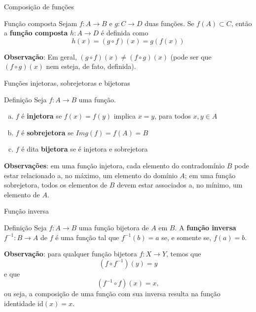 \begin{frame}[fragile]{Composição de funções}

    \begin{block}{Função composta}
        Sejam $f: A\to B$ e $g: C\to D$ duas funções. Se $f(A)\subset C$, então a \textbf{função
            composta} $h: A\to D$ é definida como
        \[
            h(x) = (g\circ f)(x) = g(f(x))
        \]
    \end{block}

    \vspace{0.2in}

    \textbf{Observação}: Em geral, $(g\circ f)(x) \neq (f\circ g)(x)$ (pode ser que $(f\circ g)(x)$
        nem esteja, de fato, definida).

\end{frame}

\begin{frame}[fragile]{Funções injetoras, sobrejetoras e bijetoras}

    \begin{block}{Definição}
        Seja $f:A\to B$ uma função.
        \begin{enumerate}[(a)]
            \item $f$ é \textbf{injetora} se $f(x) = f(y)$ implica $x = y$, para todos $x, y\in A$
            \item $f$ é \textbf{sobrejetora} se $Img(f) = f(A) = B$
            \item $f$ é dita \textbf{bijetora} se é injetora e sobrejetora
        \end{enumerate}
    \end{block}

    \vspace{0.1in}
    
    \textbf{Observações}: em uma função injetora, cada elemento do contradomínio $B$ pode estar
        relacionado a, no máximo, um elemento do domínio $A$; em uma função sobrejetora, todos
        os elementos de $B$ devem estar associados a, no mínimo, um elemento de $A$.
\end{frame}

\begin{frame}[fragile]{Função inversa}

    \begin{block}{Definição}
        Seja $f:A\to B$ uma função bijetora de $A$ em $B$. A \textbf{função inversa} 
        $f^{-1}: B\to A$ de $f$ é uma função tal que $f^{-1}(b) = a$ se, e somente se, $f(a) = b$. 
    \end{block}

    \vspace{0.2in}

    \textbf{Observação}: para qualquer função bijetora $f:X\to Y$, temos que
    \[
        (f\circ f^{-1})(y) = y
    \] e que
    \[
        (f^{-1}\circ f)(x) = x,
    \]
    ou seja, a composição de uma função com sua inversa resulta na função identidade 
    $\mathrm{id}(x) = x$.
\end{frame}
